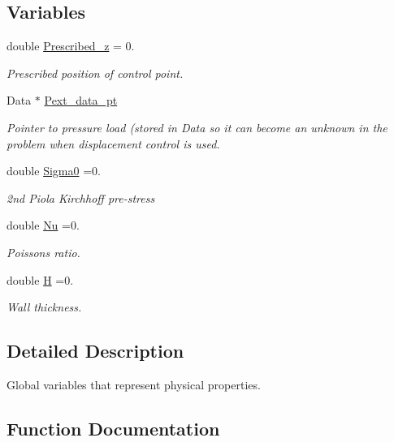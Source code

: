 \subsection*{Variables}
\begin{DoxyCompactItemize}
\item 
double \hyperlink{namespaceGlobal__Physical__Variables_a97964adfdf99492b01f8e0b1c4603bc8}{Prescribed\+\_\+z} = 0.
\begin{DoxyCompactList}\small\item\em Prescribed position of control point. \end{DoxyCompactList}\item 
Data $\ast$ \hyperlink{namespaceGlobal__Physical__Variables_a9d598320fb3d7ecf94101088e8f376d2}{Pext\+\_\+data\+\_\+pt}
\begin{DoxyCompactList}\small\item\em Pointer to pressure load (stored in Data so it can become an unknown in the problem when displacement control is used. \end{DoxyCompactList}\item 
double \hyperlink{namespaceGlobal__Physical__Variables_a417dc688a70c4f06ef0faed047068ba2}{Sigma0} =0.
\begin{DoxyCompactList}\small\item\em 2nd Piola Kirchhoff pre-\/stress \end{DoxyCompactList}\item 
double \hyperlink{namespaceGlobal__Physical__Variables_a3962c36313826b19f216f6bbbdd6a477}{Nu} =0.
\begin{DoxyCompactList}\small\item\em Poisson\textquotesingle{}s ratio. \end{DoxyCompactList}\item 
double \hyperlink{namespaceGlobal__Physical__Variables_af6e07423e22c0991084d9a2f43727805}{H} =0.
\begin{DoxyCompactList}\small\item\em Wall thickness. \end{DoxyCompactList}\end{DoxyCompactItemize}


\subsection{Detailed Description}
Global variables that represent physical properties. 

\subsection{Function Documentation}
\mbox{\label{namespaceGlobal__Physical__Variables_a80149b39ce76ea0a779f7493905eb1b8}} 
